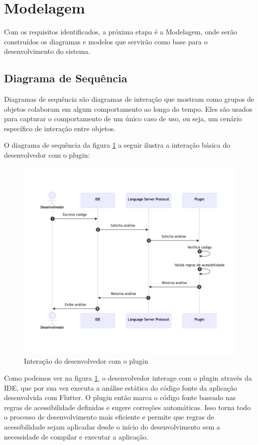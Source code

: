 \section{Modelagem}

Com os requisitos identificados, a próxima etapa é a Modelagem, onde serão construídos os diagramas e modelos que servirão como base para o desenvolvimento do sistema.

\subsection{Diagrama de Sequência}

Diagramas de sequência são diagramas de interação que mostram como grupos de objetos colaboram em algum comportamento ao longo do tempo. Eles são usados para capturar o comportamento de um único caso de uso, ou seja, um cenário específico de interação entre objetos.

O diagrama de sequência da figura \ref{fig:diagrama-sequencia-plugin} a seguir ilustra a interação básica do desenvolvedor com o plugin:

\begin{figure}[!ht]
	\centering
	\caption{Interação do desenvolvedor com o plugin}\label{fig:diagrama-sequencia-plugin}
	\includegraphics[width=325pt]{Assets/DiagramaSequenciaIDELSPPlugin.png}
\end{figure}

Como podemos ver na figura \ref{fig:diagrama-sequencia-plugin}, o desenvolvedor interage com o plugin através da IDE, que por sua vez executa a análise estática do código fonte da aplicação desenvolvida com Flutter. O plugin então marca o código fonte baseado nas regras de acessibilidade definidas e sugere correções automáticas. Isso torna todo o processo de desenvolvimento mais eficiente e permite que regras de acessibilidade sejam aplicadas desde o início do desenvolvimento sem a necessidade de compilar e executar a aplicação.

